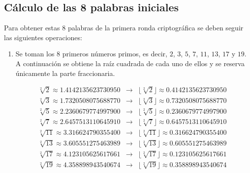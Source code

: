 \documentclass{article}
\begin{document}
    \subsection{Cálculo de las 8 palabras iniciales}
        Para obtener estas 8 palabras de la primera ronda criptográfica se deben seguir las siguientes operaciones:
        \begin{enumerate}
            \item Se toman los 8 primeros números primos, es decir, $2$, $3$, $5$, $7$, $11$, $13$, $17$ y $19$. A continuación se obtiene la raíz cuadrada de cada uno de ellos y se reserva únicamente la parte fraccionaria.
                \begin{figure}[H]
                \centering
                    $\begin{array}{lcl}
                        \sqrt[2]{2} \approx 1.4142135623730950 & \rightarrow & \lfloor \sqrt[2]{2} \rfloor \approx 0.4142135623730950 \\
                        \sqrt[2]{3} \approx 1.7320508075688770 & \rightarrow & \lfloor \sqrt[2]{3} \rfloor \approx 0.7320508075688770 \\
                        \sqrt[2]{5} \approx 2.2360679774997900 & \rightarrow & \lfloor \sqrt[2]{5} \rfloor \approx 0.2360679774997900 \\
                        \sqrt[2]{7} \approx 2.6457513110645910 & \rightarrow & \lfloor \sqrt[2]{7} \rfloor \approx 0.6457513110645910 \\
                        \sqrt[2]{11} \approx 3.316624790355400 & \rightarrow & \lfloor \sqrt[2]{11} \rfloor \approx 0.316624790355400 \\
                        \sqrt[2]{13} \approx 3.605551275463989 & \rightarrow & \lfloor \sqrt[2]{13} \rfloor \approx 0.605551275463989 \\
                        \sqrt[2]{17} \approx 4.123105625617661 & \rightarrow & \lfloor \sqrt[2]{17} \rfloor \approx 0.123105625617661 \\
                        \sqrt[2]{19} \approx 4.358898943540674 & \rightarrow & \lfloor \sqrt[2]{19} \rfloor \approx 0.358898943540674
                    \end{array}$
                \end{figure}
            

\end{enumerate}
\end{document}
